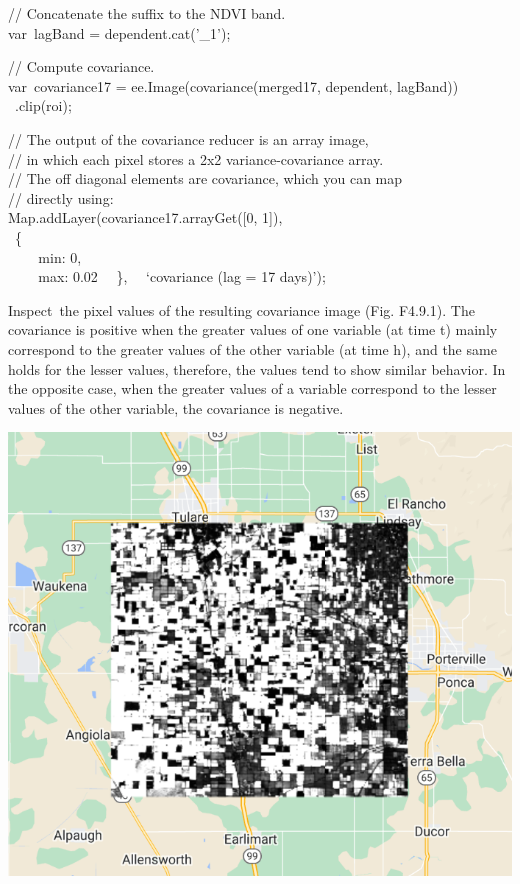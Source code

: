 \documentclass[
  letterpaper,
  DIV=11,
  numbers=noendperiod]{scrreprt}
\begin{document}
// Concatenate the suffix to the NDVI band.\\
var~lagBand = dependent.cat('\_1');

// Compute covariance.\\
var~covariance17 = ee.Image(covariance(merged17, dependent, lagBand))\\
\hspace*{0.333em} ~.clip(roi);

// The output of the covariance reducer is an array image,\\
// in which each pixel stores a 2x2 variance-covariance array.\\
// The off diagonal elements are covariance, which you can map\\
// directly using:\\
Map.addLayer(covariance17.arrayGet({[}0, 1{]}),\\
\hspace*{0.333em} ~\{\\
\hspace*{0.333em} ~ ~ ~min: 0,\\
\hspace*{0.333em} ~ ~ ~max: 0.02~ ~\},~ ~`covariance (lag = 17 days)');

Inspect~the pixel values of the resulting covariance image (Fig.
F4.9.1). The covariance is positive when the greater values of one
variable (at time t) mainly correspond to the greater values of the
other variable (at time h), and the same holds for the lesser values,
therefore, the values tend to show similar behavior. In the opposite
case, when the greater values of a variable correspond to the lesser
values of the other variable, the covariance is negative.

\includegraphics{./F4/image2.png}
\end{document}
